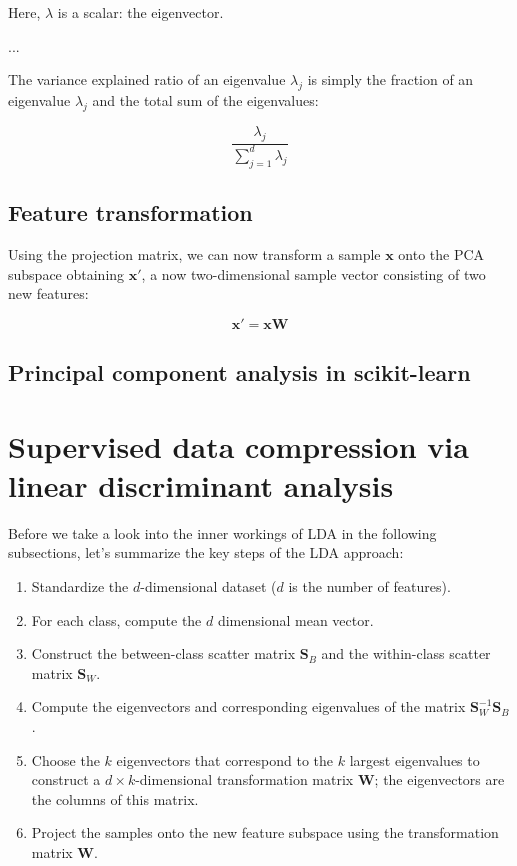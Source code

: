 \documentclass[letterpaper]{report}
\begin{document}
Here, $\lambda$ is a scalar: the eigenvector.

...

The variance explained ratio of an eigenvalue $\lambda_j$ is simply the fraction of an eigenvalue  $\lambda_j$  and the total sum of the eigenvalues: 

\[
\frac{\lambda_j}{\sum_{j=1}^{d} \lambda_j}
\]

\subsection{Feature transformation}

Using the projection matrix, we can now transform a sample $\mathbf{x}$ onto the PCA subspace obtaining $\mathbf{x}'$, a now two-dimensional sample vector consisting of two new features:

\[
\mathbf{x}' = \mathbf{xW}
\]

\subsection{Principal component analysis in scikit-learn}


\section{Supervised data compression via linear discriminant analysis}

Before we take a look into the inner workings of LDA in the following subsections, let's summarize the key steps of the LDA approach:

\begin{enumerate}
\item Standardize the $d$-dimensional dataset ($d$ is the number of features).
\item For each class, compute the $d$ dimensional mean vector.
\item Construct the between-class scatter matrix $\mathbf{S}_B$ and the within-class scatter matrix $\mathbf{S}_W$.
\item Compute the eigenvectors and corresponding eigenvalues of the matrix $\mathbf{S}_{W}^{-1} \mathbf{S}_B$.
\item Choose the $k$ eigenvectors that correspond to the $k$ largest eigenvalues to construct a  $d \times k$-dimensional transformation matrix $\mathbf{W}$; the eigenvectors are the columns of this matrix.
\item Project the samples onto the new feature subspace using the transformation matrix $\mathbf{W}$.
\end{enumerate}
\end{document}
